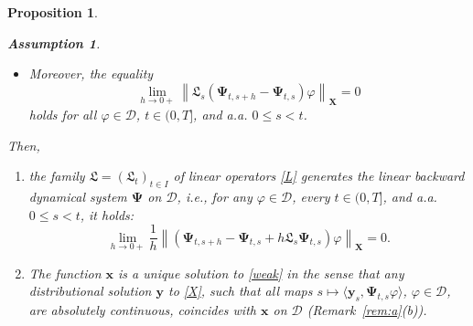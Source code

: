 \documentclass[sn-mathphys-num]{sn-jnl}
\numberwithin{equation}{section}
\theoremstyle{mythm}
\newtheorem{proposition}{Proposition}[section]
\theoremstyle{mydef}
\newtheorem{assumption}{Assumption}\renewcommand{\theassumption}{(A\arabic{assumption})}  %
\renewcommand{\phi}{\varphi}
\begin{document}
\begin{proposition}
\begin{enumerate}
\begin{tcolorbox}
\begin{assumption}
\begin{itemize}
    \item Moreover, the equality
        \[
        \lim_{h\to 0+}\left\|\mathfrak{L}_s \left(\bm{\Psi}_{t, s+h} - \bm{\Psi}_{t,s}\right)\phi\right\|_{\bm{X}} = 0 %
        \]
        holds for all $\phi \in \bm{\mathcal D}$, $t \in (0, T]$, and a.a. $0 \leq s < t$.
    \end{itemize}
    \end{assumption}
    \end{tcolorbox}
   Then,
    \begin{enumerate}[2a.]
        \item  the family $\mathfrak{L} = (\mathfrak{L}_t)_{t \in I}$ of linear operators \eqref{L} generates the linear backward dynamical system $\bm{\Psi}$ on $\bm{\mathcal D}$, i.e., for any $\phi \in \bm{\mathcal D}$, every $t \in (0, T]$, and a.a. $0 \leq s < t$, it holds: 
        \begin{equation*}
        \lim_{h \to 0+}\frac{1}{h}\left\|\left(\bm{\Psi}_{t, s+h} - \bm{\Psi}_{t,s} + h \mathfrak{L}_s \bm{\Psi}_{t, s}\right)\phi\right\|_{\bm{X}} = 0. 
        \end{equation*} 
        \item  The function $\bm x$ is a unique solution to \eqref{weak} in the sense that any distributional solution $\bm{y}$  to \eqref{X}, such that all maps $s \mapsto \langle \bm{y}_s, \bm{\Psi}_{t,s} \phi\rangle$, $\phi \in \bm{\mathcal D}$, are absolutely continuous, coincides with $\bm{x}$ on $\bm{\mathcal D}$ (Remark~\ref{rem:a}(b)).
    \end{enumerate}

\end{enumerate}
\end{proposition}
\end{document}
